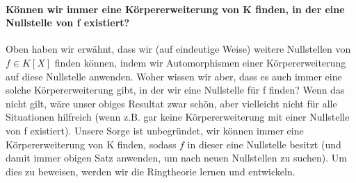 \documentclass[a4paper, 10pt]{scrartcl}
\begin{document}
\paragraph{Können wir immer eine Körpererweiterung von K finden, in der eine Nullstelle von f existiert?}
Oben haben wir erwähnt, dass wir (auf eindeutige Weise) weitere Nullstellen von $f \in K[X]$ finden können, indem wir Automorphismen einer Körpererweiterung auf diese Nullstelle anwenden. Woher wissen wir aber, dass es auch immer eine solche Körpererweiterung gibt, in der wir eine Nullstelle für f finden? Wenn das nicht gilt, wäre unser obiges Resultat zwar schön, aber vielleicht nicht für alle Situationen hilfreich (wenn z.B. gar keine Körpererweiterung mit einer Nullstelle von f existiert).\newline
Unsere Sorge ist unbegründet, wir können immer eine Körpererweiterung von K finden, sodass $f$ in dieser eine Nullstelle besitzt (und damit immer obigen Satz anwenden, um nach neuen Nullstellen zu suchen). Um dies zu beweisen, werden wir die Ringtheorie lernen und entwickeln.
\par
\end{document}
